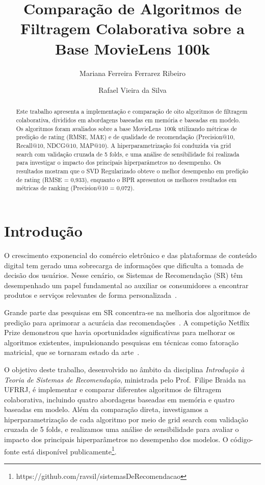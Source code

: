 \documentclass[sigconf,nonacm]{acmart}
\title{Comparação de Algoritmos de Filtragem Colaborativa sobre a Base MovieLens 100k}
\author{Mariana Ferreira Ferrarez Ribeiro}
\affiliation{
  \institution{Universidade Federal Rural do Rio de Janeiro}
  \country{Rio de Janeiro, Brasil}
}
\author{Rafael Vieira da Silva}
\affiliation{
  \institution{Universidade Federal Rural do Rio de Janeiro}
  \country{Rio de Janeiro, Brasil}
}
\begin{document}
\begin{abstract}
Este trabalho apresenta a implementação e comparação de oito algoritmos de
filtragem colaborativa, divididos em abordagens baseadas em memória e baseadas
em modelo. Os algoritmos foram avaliados sobre a base MovieLens~100k utilizando
métricas de predição de rating (RMSE, MAE) e de qualidade de recomendação
(Precision@10, Recall@10, NDCG@10, MAP@10). A hiperparametrização foi
conduzida via grid search com validação cruzada de 5 folds, e uma análise
de sensibilidade foi realizada para investigar o impacto dos principais
hiperparâmetros no desempenho. Os resultados mostram que o SVD Regularizado
obteve o melhor desempenho em predição de rating (RMSE = 0,933), enquanto o
BPR apresentou os melhores resultados em métricas de ranking
(Precision@10 = 0,072).
\end{abstract}

\maketitle

\section{Introdução}

O crescimento exponencial do comércio eletrônico e das plataformas de conteúdo
digital tem gerado uma sobrecarga de informações que dificulta a tomada de
decisão dos usuários. Nesse cenário, os Sistemas de Recomendação (SR) têm
desempenhado um papel fundamental ao auxiliar os consumidores a encontrar
produtos e serviços relevantes de forma personalizada~\cite{adomavicius2005}.

Grande parte das pesquisas em SR concentra-se na melhoria dos algoritmos de
predição para aprimorar a acurácia das recomendações~\cite{ricci2011}. A
competição Netflix Prize demonstrou que havia oportunidades significativas para
melhorar os algoritmos existentes, impulsionando pesquisas em técnicas como
fatoração matricial, que se tornaram estado da arte~\cite{koren2009}.

O objetivo deste trabalho, desenvolvido no âmbito da disciplina
\emph{Introdução à Teoria de Sistemas de Recomendação}, ministrada pelo
Prof.\ Filipe Braida na UFRRJ, é implementar e comparar diferentes algoritmos
de filtragem colaborativa, incluindo quatro abordagens baseadas em memória e
quatro baseadas em modelo. Além da comparação direta, investigamos a
hiperparametrização de cada algoritmo por meio de grid search com validação
cruzada de 5 folds, e realizamos uma análise de sensibilidade para avaliar o
impacto dos principais hiperparâmetros no desempenho dos modelos. O
código-fonte está disponível publicamente\footnote{https://github.com/ravsil/sistemasDeRecomendacao}.
\end{document}
